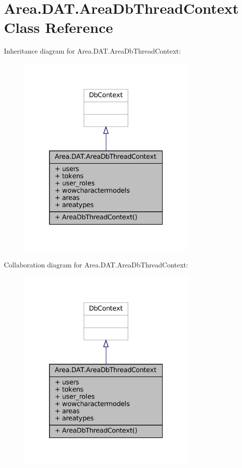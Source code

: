 \hypertarget{classArea_1_1DAT_1_1AreaDbThreadContext}{}\section{Area.\+D\+A\+T.\+Area\+Db\+Thread\+Context Class Reference}
\label{classArea_1_1DAT_1_1AreaDbThreadContext}


Inheritance diagram for Area.\+D\+A\+T.\+Area\+Db\+Thread\+Context\+:
\nopagebreak
\begin{figure}[H]
\begin{center}
\leavevmode
\includegraphics[width=253pt]{classArea_1_1DAT_1_1AreaDbThreadContext__inherit__graph}
\end{center}
\end{figure}


Collaboration diagram for Area.\+D\+A\+T.\+Area\+Db\+Thread\+Context\+:
\nopagebreak
\begin{figure}[H]
\begin{center}
\leavevmode
\includegraphics[width=253pt]{classArea_1_1DAT_1_1AreaDbThreadContext__coll__graph}
\end{center}
\end{figure}
